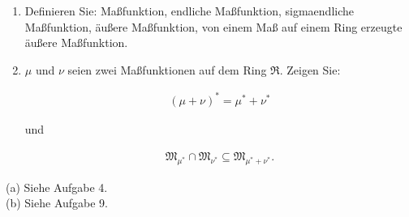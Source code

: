 
\begin{exercise}

\phantom{}

\begin{enumerate}[label = (\alph*)]

  \item
  Definieren Sie: Maßfunktion, endliche Maßfunktion, sigmaendliche Maßfunktion, äußere Maßfunktion, von einem Maß auf einem Ring erzeugte äußere Maßfunktion.
  
  \item
  $\mu$ und $\nu$ seien zwei Maßfunktionen auf dem Ring $\mathfrak{R}$. Zeigen Sie:
  
  \begin{align*}
    (\mu + \nu)^\ast = \mu^\ast + \nu^\ast
  \end{align*}
  
  und
  
  \begin{align*}
    \mathfrak{M}_{\mu^\ast} \cap \mathfrak{M}_{\nu^\ast}
    \subseteq
    \mathfrak{M}_{\mu^\ast + \nu^\ast}.
  \end{align*}

\end{enumerate}

\end{exercise}


\begin{solution}

(a) Siehe Aufgabe 4. \\

(b) Siehe Aufgabe 9.

\end{solution}

